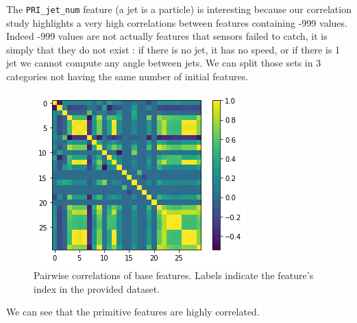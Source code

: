 \documentclass[10pt,conference,compsocconf]{IEEEtran}
\begin{document}

The \verb+PRI_jet_num+ feature (a jet is a particle) is interesting because our correlation study highlights a very high correlations between features containing -999 values. Indeed -999 values are not actually features that sensors failed to catch, it is simply that they do not exist : if there is no jet, it has no speed, or if there is 1 jet we cannot compute any angle between jets. We can split those sets in 3 categories not having the same number of initial features.\\

\begin{figure}[H]
\centering
\includegraphics[width=\linewidth]{corr.png}

\cprotect\caption{Pairwise correlations of base features. Labels indicate the feature's index in the provided dataset. }
\label{fig_corr}
\end{figure}

We can see that the primitive features are highly correlated.
\end{document}
